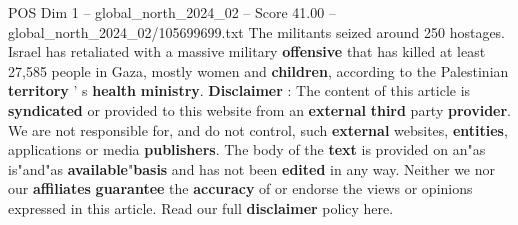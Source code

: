 \begin{textsample}{POS Dim 1 – global\_north\_2024\_02 – Score 41.00 – global\_north\_2024\_02/105699699.txt}
The militants seized around 250 hostages.
Israel has retaliated with a massive military \textbf{offensive} that has killed at least 27,585 people in Gaza, mostly women and \textbf{children}, according to the Palestinian \textbf{territory} ' s \textbf{health} \textbf{ministry}. \textbf{Disclaimer} : The content of this article is \textbf{syndicated} or provided to this website from an \textbf{external} \textbf{third} party \textbf{provider}.
We are not responsible for, and do not control, such \textbf{external} websites, \textbf{entities}, applications or media \textbf{publishers}.
The body of the \textbf{text} is provided on an"as is"and"as \textbf{available}"\textbf{basis} and has not been \textbf{edited} in any way.
Neither we nor our \textbf{affiliates} \textbf{guarantee} the \textbf{accuracy} of or endorse the views or opinions expressed in this article.
Read our full \textbf{disclaimer} policy here.

\end{textsample}
